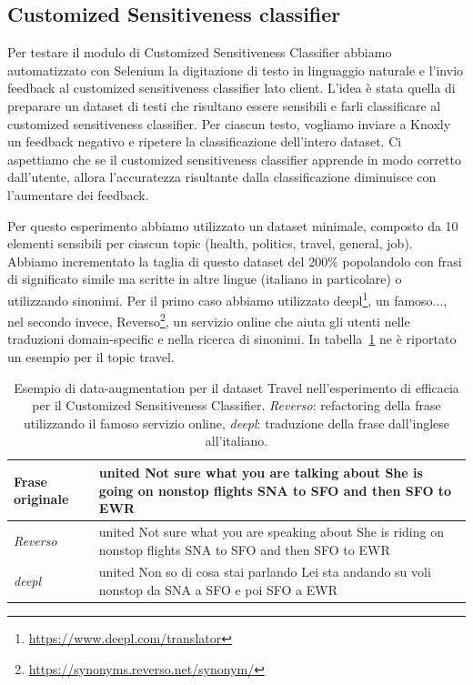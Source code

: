 \subsection{Customized Sensitiveness classifier}
\label{sec:qualCusto}
Per testare il modulo di Customized Sensitiveness Classifier abbiamo automatizzato con Selenium la digitazione di testo in linguaggio naturale e l'invio feedback al customized sensitiveness classifier lato client. L'idea è stata quella di preparare un dataset di testi che risultano essere sensibili e farli classificare al customized sensitiveness classifier. Per ciascun testo, vogliamo inviare a Knoxly un feedback negativo e ripetere la classificazione dell'intero dataset. Ci aspettiamo che se il customized sensitiveness classifier apprende in modo corretto dall'utente, allora l'accuratezza risultante dalla classificazione diminuisce con l'aumentare dei feedback.

Per questo esperimento abbiamo utilizzato un dataset minimale, composto da 10 elementi sensibili per ciascun topic (health, politics, travel, general, job). Abbiamo incrementato la taglia di questo dataset del 200\% popolandolo con frasi di significato simile ma scritte in altre lingue (italiano in particolare) o utilizzando sinonimi. Per il primo caso abbiamo utilizzato deepl\footnote{\url{https://www.deepl.com/translator}}, un famoso..., nel secondo invece, Reverso\footnote{\url{https://synonyms.reverso.net/synonym/}}, un servizio online che aiuta gli utenti nelle traduzioni domain-specific e nella ricerca di sinonimi. In tabella~\ref{tab:datasetcustomized} ne è riportato un esempio per il topic travel.


\begin{table}[h!t]
\centering
\begin{tabular}{l|p{9cm}}
\toprule
\textbf{Frase originale} & united Not sure what you are talking about She is going on nonstop flights SNA to SFO and then SFO to EWR \\
\midrule
\textit{Reverso} & united Not sure what you are speaking about She is riding on nonstop flights SNA to SFO and then SFO to EWR \\ 
\midrule
\textit{deepl} & united Non so di cosa stai parlando Lei sta andando su voli nonstop da SNA a SFO e poi SFO a EWR \\
\bottomrule
\end{tabular}
\label{tab:datasetcustomized}
\caption{Esempio di data-augmentation per il dataset Travel nell'esperimento di efficacia per il Customized Sensitiveness Classifier. \textit{Reverso}: refactoring della frase utilizzando il famoso servizio online, \textit{deepl}: traduzione della frase dall'inglese all'italiano.}
\end{table}
\FloatBarrier

